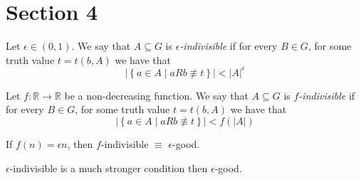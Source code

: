 \section{Section 4} \label{sec:section_4}

    Let $\epsilon \in (0,1)$.
    We say that $A \subseteq G$ is \emph{$\epsilon$-indivisible} if for every $B \in G$, for some truth value $t = t(b,A)$ we have that
    \[
    |\left\{ a\in A \mid a R b \not\equiv t \right\}| < |A|^{\epsilon}
    \]

    Let $f: \mathbb{R} \longrightarrow \mathbb{R}$ be a non-decreasing function.
    We say that $A \subseteq G$ is \emph{$f$-indivisible} if for every $B \in G$, for some truth value $t = t(b,A)$ we have that
    \[
    |\left\{ a\in A \mid a R b \not\equiv t \right\}| < f(|A|)
    \]

    \remark
    If $f(n) = \epsilon n$, then $f$-indivisible $\equiv$ $\epsilon$-good.

    \remark
    $\epsilon$-indivisible is a much stronger condition then $\epsilon$-good.

